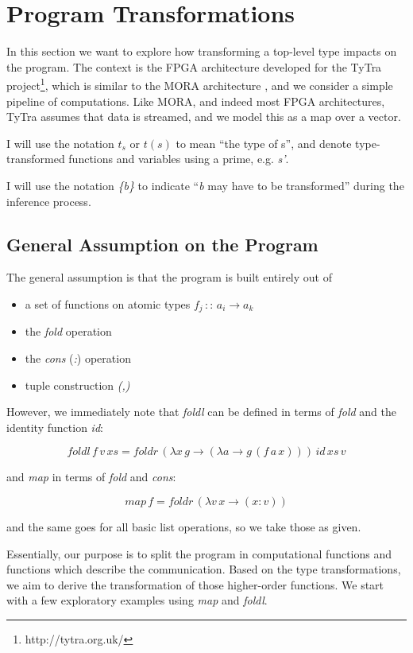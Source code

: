 \documentclass{article}
\begin{document}
\section{Program Transformations}

In this section we want to explore how transforming a top-level type
impacts on the program. The context is the  FPGA architecture developed for the TyTra project\footnote{http://tytra.org.uk/}, which is similar to the MORA architecture \cite{chalamalasetti2009mora}, and
we consider a simple pipeline of computations. Like MORA, and indeed most FPGA architectures, TyTra assumes that
data is streamed, and we model this as a map over a vector.

I will use the notation $t_{s}$ or $t(s)$ to mean ``the type of
s'', and denote type-transformed functions and variables using a
prime, e.g. \emph{s'}.

I will use the notation \emph{\{b\}} to indicate ``\emph{b} may have
to be transformed'' during the inference process.


\subsection{General Assumption on the Program}

The general assumption is that the program is built entirely out of 
\begin{itemize}
\item a set of functions on atomic types $f_{j}\,::\, a_{i}\rightarrow a_{k}$
\item the \emph{fold} operation \cite{hutton1999tutorial}
\item the \emph{cons} (\emph{:}) operation
\item tuple construction \emph{(,)}
\end{itemize}
However, we immediately note that \emph{foldl} can be defined in terms
of \emph{fold} and the identity function \emph{id}:

\[
foldl\, f\, v\, xs=foldr\,(\lambda x\, g\rightarrow(\lambda a\rightarrow g\,(f\, a\, x)))\, id\, xs\, v
\]


and \emph{map} in terms of \emph{fold} and \emph{cons}:

\[
map\, f=foldr\,(\lambda v\, x\rightarrow(x:v))
\]


and the same goes for all basic list operations, so we take those
as given.

Essentially, our purpose is to split the program in computational
functions and functions which describe the communication. Based on
the type transformations, we aim to derive the transformation of those
higher-order functions. We start with a few exploratory examples using
\emph{map} and \emph{foldl}.
\end{document}
